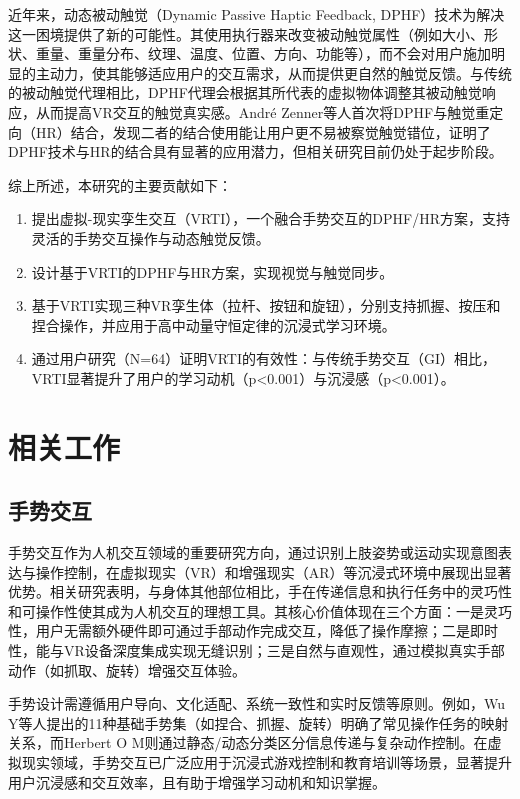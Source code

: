 \documentclass[runningheads]{llncs}
\begin{document}
近年来，动态被动触觉（Dynamic Passive Haptic Feedback, DPHF）技术为解决这一困境提供了新的可能性\cite{zenner2017shifty}。其使用执行器来改变被动触觉属性（例如大小、形状、重量、重量分布、纹理、温度、位置、方向、功能等），而不会对用户施加明显的主动力，使其能够适应用户的交互需求，从而提供更自然的触觉反馈。与传统的被动触觉代理相比，DPHF代理会根据其所代表的虚拟物体调整其被动触觉响应，从而提高VR交互的触觉真实感。André Zenner等人首次将DPHF与触觉重定向（HR）结合，发现二者的结合使用能让用户更不易被察觉触觉错位，证明了DPHF技术与HR的结合具有显著的应用潜力\cite{zenner2021combining}，但相关研究目前仍处于起步阶段。

综上所述，本研究的主要贡献如下：

\begin{enumerate}[label={\arabic*)}]
  \item 提出虚拟-现实孪生交互（VRTI），一个融合手势交互的DPHF/HR方案，支持灵活的手势交互操作与动态触觉反馈。
  \item 设计基于VRTI的DPHF与HR方案，实现视觉与触觉同步。
  \item 基于VRTI实现三种VR孪生体（拉杆、按钮和旋钮），分别支持抓握、按压和捏合操作，并应用于高中动量守恒定律的沉浸式学习环境。
  \item 通过用户研究（N=64）证明VRTI的有效性：与传统手势交互（GI）相比，VRTI显著提升了用户的学习动机（p<0.001）与沉浸感（p<0.001）。
\end{enumerate}

\section{相关工作}
\subsection{手势交互} 
手势交互作为人机交互领域的重要研究方向，通过识别上肢姿势或运动实现意图表达与操作控制\cite{yang2019gesture}，在虚拟现实（VR）和增强现实（AR）等沉浸式环境中展现出显著优势\cite{10574578}。相关研究表明，与身体其他部位相比，手在传递信息和执行任务中的灵巧性和可操作性使其成为人机交互的理想工具\cite{karam2006framework}。其核心价值体现在三个方面\cite{mitra2007gesture,10580881,app14114935}：一是灵巧性，用户无需额外硬件即可通过手部动作完成交互，降低了操作摩擦；二是即时性，能与VR设备深度集成实现无缝识别；三是自然与直观性，通过模拟真实手部动作（如抓取、旋转）增强交互体验。

手势设计需遵循用户导向、文化适配、系统一致性和实时反馈等原则\cite{lou2018analysis}。例如，Wu Y等人提出的11种基础手势集（如捏合、抓握、旋转）明确了常见操作任务的映射关系\cite{wu2024empirical}，而Herbert O M则通过静态/动态分类区分信息传递与复杂动作控制\cite{herbert2024static}。在虚拟现实领域，手势交互已广泛应用于沉浸式游戏控制和教育培训等场景\cite{10574578,lu2024chemical}，显著提升用户沉浸感和交互效率\cite{10580881}，且有助于增强学习动机和知识掌握\cite{lu2024chemical}。
\end{document}
